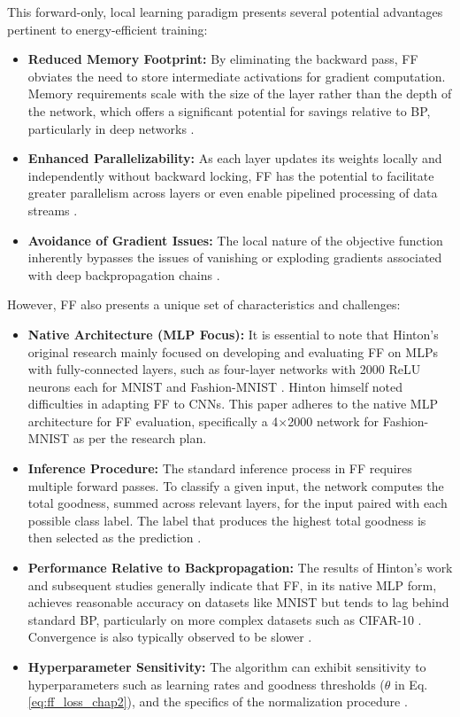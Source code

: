 This forward-only, local learning paradigm presents several potential advantages pertinent to energy-efficient training:
\begin{itemize}
    \item \textbf{Reduced Memory Footprint:} By eliminating the backward pass, FF obviates the need to store intermediate activations for gradient computation. Memory requirements scale with the size of the layer rather than the depth of the network, which offers a significant potential for savings relative to BP, particularly in deep networks \cite{hinton2022forward}.
    \item \textbf{Enhanced Parallelizability:} As each layer updates its weights locally and independently without backward locking, FF has the potential to facilitate greater parallelism across layers or even enable pipelined processing of data streams \cite{hinton2022forward}.
    \item \textbf{Avoidance of Gradient Issues:} The local nature of the objective function inherently bypasses the issues of vanishing or exploding gradients associated with deep backpropagation chains \cite{hinton2022forward}.
\end{itemize}

However, FF also presents a unique set of characteristics and challenges:
\begin{itemize}
    \item \textbf{Native Architecture (MLP Focus):} It is essential to note that Hinton's original research mainly focused on developing and evaluating FF on MLPs with fully-connected layers, such as four-layer networks with 2000 ReLU neurons each for MNIST and Fashion-MNIST \cite{hinton2022forward}. Hinton himself noted difficulties in adapting FF to CNNs. This paper adheres to the native MLP architecture for FF evaluation, specifically a 4$\times$2000 network for Fashion-MNIST as per the research plan.
    \item \textbf{Inference Procedure:} The standard inference process in FF requires multiple forward passes. To classify a given input, the network computes the total goodness, summed across relevant layers, for the input paired with each possible class label. The label that produces the highest total goodness is then selected as the prediction \cite{hinton2022forward}.
    \item \textbf{Performance Relative to Backpropagation:} The results of Hinton's work and subsequent studies generally indicate that FF, in its native MLP form, achieves reasonable accuracy on datasets like MNIST but tends to lag behind standard BP, particularly on more complex datasets such as CIFAR-10 \cite{hinton2022forward}. Convergence is also typically observed to be slower \cite{hinton2022forward}.
    \item \textbf{Hyperparameter Sensitivity:} The algorithm can exhibit sensitivity to hyperparameters such as learning rates and goodness thresholds ($\theta$ in Eq. \ref{eq:ff_loss_chap2}), and the specifics of the normalization procedure \cite{hinton2022forward}.
\end{itemize}

